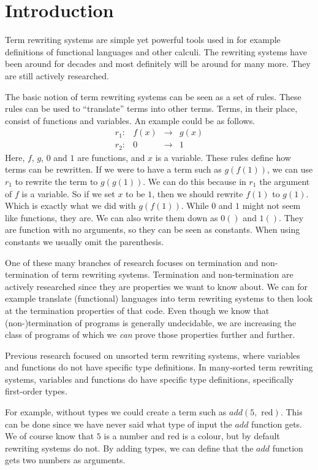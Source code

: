 \chapter{Introduction}\label{introduction}
Term rewriting systems are simple yet powerful tools used in for example definitions of functional languages and other calculi. The rewriting systems have been around for decades and most definitely will be around for many more. They are still actively researched. 

The basic notion of term rewriting systems can be seen as a set of rules. These rules can be used to ``translate'' terms into other terms. Terms, in their place, consist of functions and variables. An example could be as follows.
\[
\begin{array}{lrcl}
r_1: & f(x) & \rightarrow & g(x) \\
r_2: & 0 & \rightarrow & 1
\end{array}
\]
Here, $f$, $g$, $0$ and $1$ are functions, and $x$ is a variable. These rules define how terms can be rewritten. If we were to have a term such as $g(f(1))$, we can use $r_1$ to rewrite the term to $g(g(1))$. We can do this because in $r_1$ the argument of $f$ is a variable. So if we set $x$ to be $1$, then we should rewrite $f(1)$ to $g(1)$. Which is exactly what we did with $g(f(1))$. While $0$ and $1$ might not seem like functions, they are. We can also write them down as $0()$ and $1()$. They are function with no arguments, so they can be seen as constants. When using constants we usually omit the parenthesis. 

One of these many branches of research focuses on termination and non-termination of term rewriting systems. Termination and non-termination are actively researched since they are properties we want to know about. We can for example translate (functional) languages into term rewriting systems to then look at the termination properties of that code. Even though we know that (non-)termination of programs is generally undecidable, we are increasing the class of programs of which we \textit{can} prove those properties further and further.

Previous research focused on unsorted term rewriting systems, where variables and functions do not have specific type definitions. In many-sorted term rewriting systems, variables and functions do have specific type definitions, specifically first-order types. 

For example, without types we could create a term such as $add(5, \text{ red})$. This can be done since we have never said what type of input the $add$ function gets. We of course know that $5$ is a number and red is a colour, but by default rewriting systems do not. By adding types, we can define that the $add$ function gets two numbers as arguments.

